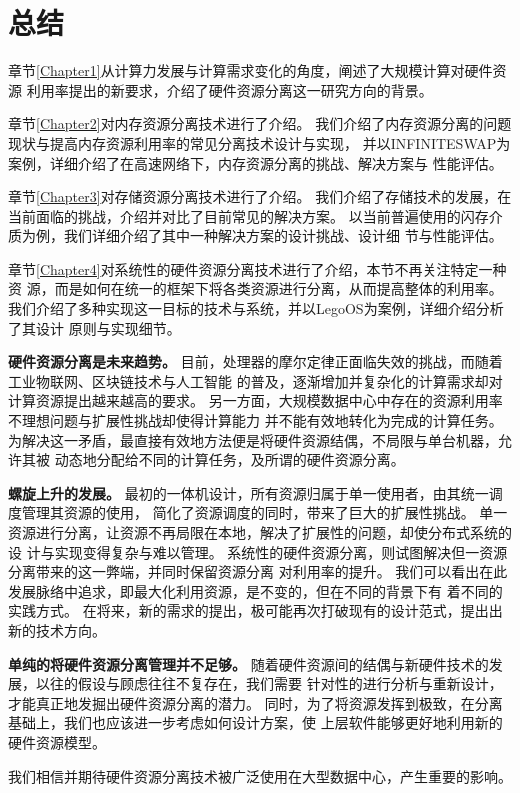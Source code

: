 \chapter{总结} %

\label{Chapter5} %

章节\ref{Chapter1}从计算力发展与计算需求变化的角度，阐述了大规模计算对硬件资源
利用率提出的新要求，介绍了硬件资源分离这一研究方向的背景。

章节\ref{Chapter2}对内存资源分离技术进行了介绍。
我们介绍了内存资源分离的问题现状与提高内存资源利用率的常见分离技术设计与实现，
并以INFINITESWAP为案例，详细介绍了在高速网络下，内存资源分离的挑战、解决方案与
性能评估。

章节\ref{Chapter3}对存储资源分离技术进行了介绍。
我们介绍了存储技术的发展，在当前面临的挑战，介绍并对比了目前常见的解决方案。
以当前普遍使用的闪存介质为例，我们详细介绍了其中一种解决方案的设计挑战、设计细
节与性能评估。

章节\ref{Chapter4}对系统性的硬件资源分离技术进行了介绍，本节不再关注特定一种资
源，而是如何在统一的框架下将各类资源进行分离，从而提高整体的利用率。
我们介绍了多种实现这一目标的技术与系统，并以LegoOS为案例，详细介绍分析了其设计
原则与实现细节。

\textbf{硬件资源分离是未来趋势。}
目前，处理器的摩尔定律正面临失效的挑战，而随着工业物联网、区块链技术与人工智能
的普及，逐渐增加并复杂化的计算需求却对计算资源提出越来越高的要求。
另一方面，大规模数据中心中存在的资源利用率不理想问题与扩展性挑战却使得计算能力
并不能有效地转化为完成的计算任务。
为解决这一矛盾，最直接有效地方法便是将硬件资源结偶，不局限与单台机器，允许其被
动态地分配给不同的计算任务，及所谓的硬件资源分离。

\textbf{螺旋上升的发展。}
最初的一体机设计，所有资源归属于单一使用者，由其统一调度管理其资源的使用，
简化了资源调度的同时，带来了巨大的扩展性挑战。
单一资源进行分离，让资源不再局限在本地，解决了扩展性的问题，却使分布式系统的设
计与实现变得复杂与难以管理。
系统性的硬件资源分离，则试图解决但一资源分离带来的这一弊端，并同时保留资源分离
对利用率的提升。
我们可以看出在此发展脉络中追求，即最大化利用资源，是不变的，但在不同的背景下有
着不同的实践方式。
在将来，新的需求的提出，极可能再次打破现有的设计范式，提出出新的技术方向。

\textbf{单纯的将硬件资源分离管理并不足够。}
随着硬件资源间的结偶与新硬件技术的发展，以往的假设与顾虑往往不复存在，我们需要
针对性的进行分析与重新设计，才能真正地发掘出硬件资源分离的潜力。
同时，为了将资源发挥到极致，在分离基础上，我们也应该进一步考虑如何设计方案，使
上层软件能够更好地利用新的硬件资源模型。

我们相信并期待硬件资源分离技术被广泛使用在大型数据中心，产生重要的影响。